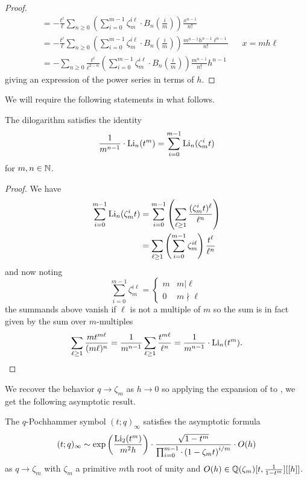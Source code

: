 \begin{proof}
\begin{align*}
        &= -\frac{t^{\ell}}{\ell}\sum_{n\geq0}\left(\sum_{i=0}^{m-1}\zeta_{m}^{i\ell}\cdot B_{n}\left(\frac{i}{m}\right)\right)\frac{x^{n-1}}{n!} \\
        &= -\frac{t^{\ell}}{\ell}\sum_{n\geq0}\left(\sum_{i=0}^{m-1}\zeta_{m}^{i\ell}\cdot B_{n}\left(\frac{i}{m}\right)\right)\frac{m^{n-1}h^{n-1}\ell^{n-1}}{n!} && x=mh\ell\\
        &= -\sum_{n\geq0}\frac{t^{\ell}}{\ell^{2-n}}\left(\sum_{i=0}^{m-1}\zeta_{m}^{i\ell}\cdot B_{n}\left(\frac{i}{m}\right)\right)\frac{m^{n-1}}{n!}h^{n-1}
    \end{align*}
    giving an expression of the power series in terms of $h$. 
\end{proof}
We will require the following statements in what follows. 
\begin{lemma}\label{lem: dilogarithm roots of unity sum}
    The dilogarithm satisfies the identity 
    \begin{equation}\label{eqn: dilogarithm roots of unity sum}
        \frac{1}{m^{n-1}}\cdot\mathrm{Li}_{n}(t^{m}) = \sum_{i=0}^{m-1}\mathrm{Li}_{n}(\zeta_{m}^{i}t)
    \end{equation}
    for $m,n\in\mathbb{N}$. 
\end{lemma}
\begin{proof}
    We have 
    \begin{align*}
        \sum_{i=0}^{m-1}\mathrm{Li}_{n}(\zeta_{m}^{i}t) &= \sum_{i=0}^{m-1}\left(\sum_{\ell\geq1}\frac{(\zeta_{m}^{i}t)^{\ell}}{\ell^{n}}\right) \\
        &= \sum_{\ell\geq 1}\left(\sum_{i=0}^{m-1}\zeta_{m}^{i\ell}\right)\frac{t^{\ell}}{\ell^{n}}
    \end{align*}  
    and now noting 
    $$\sum_{i=0}^{m-1}\zeta_{m}^{i\ell}=\begin{cases}
        m & m|\ell \\
        0 & m\nmid\ell
    \end{cases}$$
    the summands above vanish if $\ell$ is not a multiple of $m$ so the sum is in fact given by the sum over $m$-multiples
    $$\sum_{\ell\geq1}\frac{mt^{m\ell}}{(m\ell)^{n}}=\frac{1}{m^{n-1}}\sum_{\ell\geq1}\frac{t^{m\ell}}{\ell^{n}}=\frac{1}{m^{n-1}}\cdot\mathrm{Li}_{n}(t^{m}).$$
\end{proof}
We recover the behavior $q\to\zeta_{m}$ as $h\to0$ so applying the expansion of  to , we get the following asymptotic result. 
\begin{proposition}\label{prop: asymptotics of q t Pochhammer at root of unity}
    The $q$-Pochhammer symbol $(t;q)_{\infty}$ satisfies the asymptotic formula
    \begin{equation}\label{eqn: asymptotics of q t Pochhammer at root of unity}
        (t;q)_{\infty}\sim\exp\left(\frac{\mathrm{Li}_{2}(t^{m})}{m^{2}h}\right)\cdot\frac{\sqrt{1-t^{m}}}{\prod_{i=0}^{m-1}\cdot\left(1-\zeta_{m}t\right)^{i/m}}\cdot O(h)
    \end{equation}
    as $q\to \zeta_{m}$ with $\zeta_{m}$ a primitive $m$th root of unity and $O(h)\in\mathbb{Q}(\zeta_{m})[t,\frac{1}{1-t^{m}}][[h]]$.
\end{proposition}
